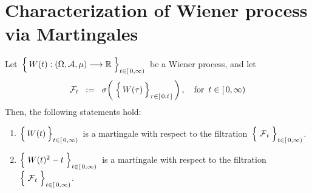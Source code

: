 

\section{Characterization of Wiener process via Martingales}
\setcounter{theorem}{0}
\setcounter{equation}{0}


\renewcommand{\theenumi}{\roman{enumi}}
\renewcommand{\labelenumi}{\textnormal{(\theenumi)}$\;\;$}


\begin{proposition}
\label{WienerProcessMartingales}
\mbox{}
\vskip 0.2cm
\noindent
Let
\,$\left\{\,\overset{{\color{white}.}}{W}(t) : (\Omega,\mathcal{A},\mu) \longrightarrow \Re \;\right\}_{t \in[\,0,\infty)}$\,
be a Wiener process, and let
\begin{equation*}
\mathcal{F}_{t}
\;\; := \;\;
	\sigma\!\left(\;\left\{\,
		\overset{{\color{white}.}}{W}(\tau)
		\,\right\}_{\tau \in [\,0,t\,]}\,\right),
	\quad
	\textnormal{for \,$t \in [\,0,\infty)$}
\end{equation*}	
Then, the following statements hold:
\begin{enumerate}
\item
	$\left\{\,\overset{{\color{white}.}}{W}(t)\,\right\}_{t \in[\,0,\infty)}$\,
	is a martingale with respect to the filtration
	\,$\left\{\;\overset{{\color{white}.}}{\mathcal{F}}_{t}\;\right\}_{t\in[\,0,\infty)}$.
\item
	$\left\{\; \overset{{\color{white}.}}{W}(t)^{2} - t \;\right\}_{t \in[\,0,\infty)}$\,
	is a martingale with respect to the filtration
	\,$\left\{\;\overset{{\color{white}.}}{\mathcal{F}}_{t}\;\right\}_{t\in[\,0,\infty)}$.
\end{enumerate}
\end{proposition}
\proof
